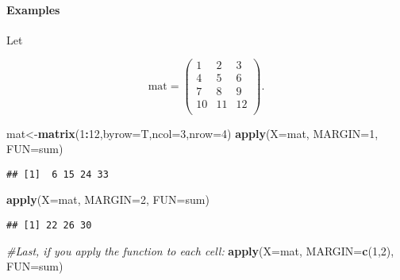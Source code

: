 \documentclass[
]{article}
\newenvironment{Shaded}{\begin{snugshade}}{\end{snugshade}}
\newcommand{\AttributeTok}[1]{\textcolor[rgb]{0.13,0.29,0.53}{#1}}
\newcommand{\CommentTok}[1]{\textcolor[rgb]{0.56,0.35,0.01}{\textit{#1}}}
\newcommand{\DecValTok}[1]{\textcolor[rgb]{0.00,0.00,0.81}{#1}}
\newcommand{\FunctionTok}[1]{\textcolor[rgb]{0.13,0.29,0.53}{\textbf{#1}}}
\newcommand{\NormalTok}[1]{#1}
\newcommand{\OtherTok}[1]{\textcolor[rgb]{0.56,0.35,0.01}{#1}}
\newcommand{\SpecialCharTok}[1]{\textcolor[rgb]{0.81,0.36,0.00}{\textbf{#1}}}
\begin{document}
\hypertarget{examples}{%
\paragraph{Examples}\label{examples}}

Let

\[
\text{mat}=\left(
\begin{array}{ccc}
1 & 2 & 3 \\
4 & 5 & 6\\
7 & 8 & 9\\
10 & 11 & 12\\
\end{array}
\right).
\]

\begin{Shaded}
\begin{Highlighting}[]
\NormalTok{mat}\OtherTok{\textless{}{-}}\FunctionTok{matrix}\NormalTok{(}\DecValTok{1}\SpecialCharTok{:}\DecValTok{12}\NormalTok{,}\AttributeTok{byrow=}\NormalTok{T,}\AttributeTok{ncol=}\DecValTok{3}\NormalTok{,}\AttributeTok{nrow=}\DecValTok{4}\NormalTok{)}
\FunctionTok{apply}\NormalTok{(}\AttributeTok{X=}\NormalTok{mat, }\AttributeTok{MARGIN=}\DecValTok{1}\NormalTok{, }\AttributeTok{FUN=}\NormalTok{sum)}
\end{Highlighting}
\end{Shaded}

\begin{verbatim}
## [1]  6 15 24 33
\end{verbatim}

\begin{Shaded}
\begin{Highlighting}[]
\FunctionTok{apply}\NormalTok{(}\AttributeTok{X=}\NormalTok{mat, }\AttributeTok{MARGIN=}\DecValTok{2}\NormalTok{, }\AttributeTok{FUN=}\NormalTok{sum)}
\end{Highlighting}
\end{Shaded}

\begin{verbatim}
## [1] 22 26 30
\end{verbatim}

\begin{Shaded}
\begin{Highlighting}[]
\CommentTok{\#Last, if you apply the function to each cell:}
\FunctionTok{apply}\NormalTok{(}\AttributeTok{X=}\NormalTok{mat, }\AttributeTok{MARGIN=}\FunctionTok{c}\NormalTok{(}\DecValTok{1}\NormalTok{,}\DecValTok{2}\NormalTok{), }\AttributeTok{FUN=}\NormalTok{sum)}
\end{Highlighting}
\end{Shaded}
\end{document}
